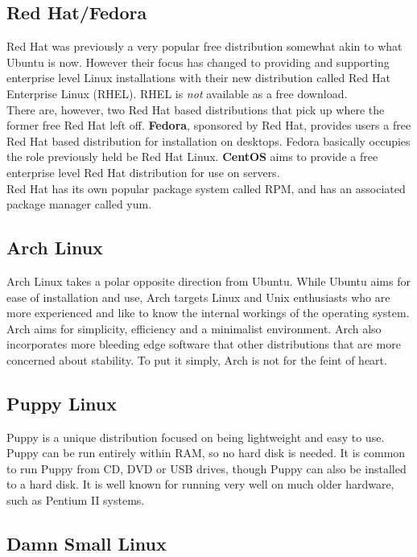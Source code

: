 \subsection{Red Hat/Fedora}

Red Hat was previously a very popular free distribution somewhat akin to what Ubuntu is now.  However their focus has changed to providing and supporting enterprise level Linux installations with their new distribution called Red Hat Enterprise Linux (RHEL).  RHEL is \textit{not} available as a free download.\\

There are, however, two Red Hat based distributions that pick up where the former free Red Hat left off.  \textbf{Fedora}, sponsored by Red Hat, provides users a free Red Hat based distribution for installation on desktops.  Fedora basically occupies the role previously held be Red Hat Linux.  \textbf{CentOS} aims to provide a free enterprise level Red Hat distribution for use on servers.\\

Red Hat has its own popular package system called RPM, and has an associated package manager called yum.

\subsection{Arch Linux}

Arch Linux takes a polar opposite direction from Ubuntu.  While Ubuntu aims for ease of installation and use, Arch targets Linux and Unix enthusiasts who are more experienced and like to know the internal workings of the operating system.  Arch aims for simplicity, efficiency and a minimalist environment.  Arch also incorporates more bleeding edge software that other distributions that are more concerned about stability.  To put it simply, Arch is not for the feint of heart.

\subsection{Puppy Linux}

Puppy is a unique distribution focused on being lightweight and easy to use.  Puppy can be run entirely within RAM, so no hard disk is needed.  It is common to run Puppy from CD, DVD or USB drives, though Puppy can also be installed to a hard disk.  It is well known for running very well on much older hardware, such as Pentium II systems.

\subsection{Damn Small Linux}

